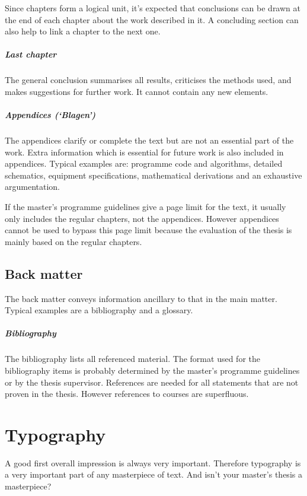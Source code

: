 \documentclass[11pt,article,oneside,british,extralanguage=dutch]{kulemt}
\newcommand\Dutch[1]{`{\selectlanguage{dutch}#1}'}
\begin{document}
Since chapters form a logical unit, it's expected that conclusions can be
drawn at the end of each chapter about the work described in it. A
concluding section can also help to link a chapter to the next one.

\paragraph{Last chapter} The general conclusion summarises all results,
criticises the methods used, and makes suggestions for further work. It
cannot contain any new elements.

\paragraph{Appendices (\Dutch{B\ij lagen})} The appendices clarify or
complete the text but are not an essential part of the work. Extra
information which is essential for future work is also included in
appendices. Typical examples are: programme code and algorithms, detailed
schematics, equipment specifications, mathematical derivations and an
exhaustive argumentation.

If the master's programme guidelines give a page limit for the text, it
usually only includes the regular chapters, not the appendices. However
appendices cannot be used to bypass this page limit because the evaluation of
the thesis is mainly based on the regular chapters.

\section{Back matter}
The back matter conveys information ancillary to that in the main matter.
Typical examples are a bibliography and a glossary.

\paragraph{Bibliography} The bibliography lists all referenced material. The
format used for the bibliography items is probably determined by the master's
programme guidelines or by the thesis supervisor. References are needed for all
statements that are not proven in the thesis. However references to courses are
superfluous.

\chapter{Typography}
A good first overall impression is always very important. Therefore
typography is a very important part of any masterpiece of text. And isn't
your master's thesis a masterpiece?
\end{document}
